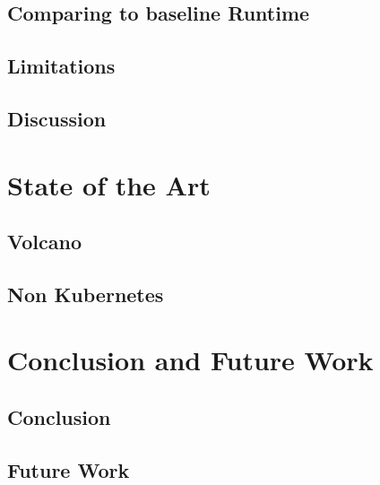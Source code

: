 \section{Comparing to baseline Runtime}

\section{Limitations}

\section{Discussion}


\chapter{State of the Art}
\section{Volcano}

\section{Non Kubernetes}


\chapter{Conclusion and Future Work}
\section{Conclusion}

\section{Future Work}






